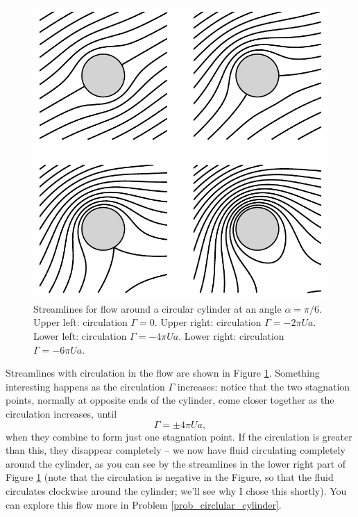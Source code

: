 \begin{figure}
\centering\includegraphics[width=0.75\linewidth]{Figures/Chapter4/fig_cylinder_circ}
\caption{Streamlines for flow around a circular cylinder at an angle $\alpha = \pi/6$.  Upper left: circulation $\Gamma = 0$.  Upper right: circulation $\Gamma = -2\pi Ua$.  Lower left: circulation $\Gamma = -4\pi Ua$.  Lower right: circulation $\Gamma = -6\pi Ua$.}
\label{fig_cylinder_circ}
\end{figure}

Streamlines with circulation in the flow are shown in Figure \ref{fig_cylinder_circ}.  Something interesting happens as the circulation $\Gamma$ increases:  notice that the two stagnation points, normally at opposite ends of the cylinder, come closer together as the circulation increases, until 
\[
\Gamma = \pm 4\pi U a,
\]
when they combine to form just one stagnation point.  If the circulation is greater than this, they disappear completely -- we now have fluid circulating completely around the cylinder, as you can see by the streamlines in the lower right part of Figure \ref{fig_cylinder_circ} (note that the circulation is negative in the Figure, so that the fluid circulates clockwise around the cylinder; we'll see why I chose this shortly).  You can explore this flow more in Problem \ref{prob_circlular_cylinder}.


